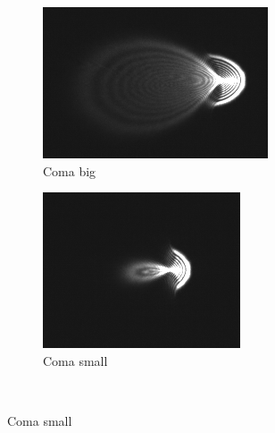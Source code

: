 \documentclass[a4paper,12pt]{article}
\begin{document}
\begin{figure}[H]
        \centering
        \begin{subfigure}{0.3\textwidth}
                \includegraphics[width=\textwidth]{comastor}
                \caption{Coma big}
                \label{fig:comastor}
        \end{subfigure}
        \begin{subfigure}{0.3\textwidth}
                \includegraphics[width=\textwidth]{comaliten}
                \caption{Coma small}
                \label{fig:comaliten}
        \end{subfigure}%
        ~ %

\end{figure}
\end{document}
